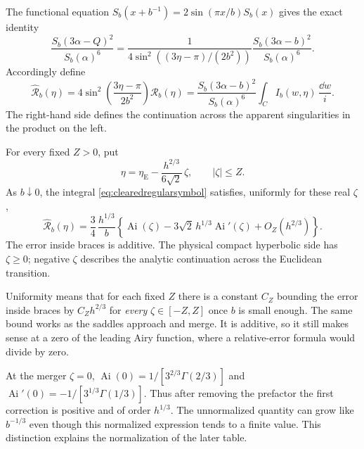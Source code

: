 The functional equation $S_b(x+b^{-1})=2\sin(\pi x/b)S_b(x)$
gives the exact identity
\begin{equation}
 \frac{S_b(3\alpha-Q)^2}{S_b(\alpha)^6}
 =
 \frac{1}{4\sin^2((3\eta-\pi)/(2b^2))}
 \frac{S_b(3\alpha-b)^2}{S_b(\alpha)^6}.
 \label{eq:externalpoleclearing}
\end{equation}
Accordingly define
\begin{equation}
 \widehat{\mathcal R}_b(\eta)
 =
 4\sin^2\!\left(\frac{3\eta-\pi}{2b^2}\right)\mathcal R_b(\eta)
 =
 \frac{S_b(3\alpha-b)^2}{S_b(\alpha)^6}
 \int_C I_b(w,\eta)\,\frac{\dd w}{i}.
 \label{eq:clearedregularsymbol}
\end{equation}
The right-hand side defines the continuation across the apparent
singularities in the product on the left.

\begin{proposition}
\label{prop:regularquantumAiry}
For every fixed $Z>0$, put
\[
 \eta=\eta_{\mathrm E}
       -\frac{h^{2/3}}{6\sqrt2}\,\zeta,
       \qquad |\zeta|\le Z.
\]
As $b\downarrow0$, the integral \eqref{eq:clearedregularsymbol}
satisfies, uniformly for these real $\zeta$,
\begin{equation}
 \boxed{\quad
 \widehat{\mathcal R}_b(\eta)=
 \frac34\,\frac{h^{1/3}}{b}
 \left\{
 \operatorname{Ai}(\zeta)
 -3\sqrt2\,h^{1/3}\operatorname{Ai}'(\zeta)
 +O_Z(h^{2/3})
 \right\}.
 \quad}
 \label{eq:quantumAirytheorem}
\end{equation}
The error inside braces is additive. The physical compact
hyperbolic side has $\zeta\ge0$; negative $\zeta$ describes the
analytic continuation across the Euclidean transition.
\end{proposition}

Uniformity means that for each fixed $Z$ there is a constant
$C_Z$ bounding the error inside braces by $C_Zh^{2/3}$ for
\emph{every} $\zeta\in[-Z,Z]$ once $b$ is small enough.
The same bound works as the saddles approach and merge.
It is additive, so it still makes sense at a zero of the leading
Airy function, where a relative-error formula would divide by zero.

At the merger $\zeta=0$,
$\operatorname{Ai}(0)=1/[3^{2/3}\Gamma(2/3)]$ and
$\operatorname{Ai}'(0)=-1/[3^{1/3}\Gamma(1/3)]$.
Thus after removing the prefactor the first correction is positive
and of order $h^{1/3}$. The unnormalized quantity can grow like
$b^{-1/3}$ even though this normalized expression tends to a finite
value. This distinction explains the normalization of the later table.

